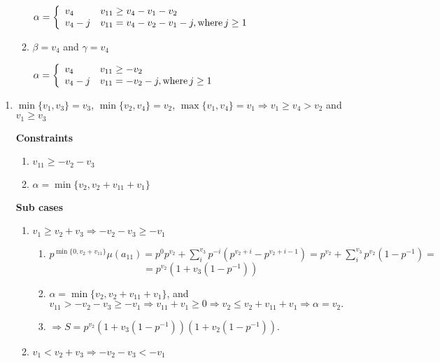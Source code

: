 \documentclass{article}
\begin{document}
\begin{enumerate}
\begin{enumerate}
$\alpha=\left\{
	\begin{array}{ll}
            v_4  & v_{11}\geq{v_4-v_1-v_2} \\
		  v_4-j & v_{11}=v_4-v_2-v_1-j, \text{where\,}j\geq{1}
	\end{array}
\right.$    
\item $\beta=v_4$ and $\gamma=v_4$

$\alpha=\left\{
	\begin{array}{ll}
            v_4  & v_{11}\geq{-v_2} \\
		  v_4-j & v_{11}=-v_2-j, \text{where\,}j\geq{1}
	\end{array}
\right.$
\end{enumerate}
\end{enumerate}
\begin{enumerate}
    \item $\min\{v_1,v_3\}=v_3$, $\min\{v_2,v_4\}=v_2$, $\max\{v_1,v_4\}=v_1\Rightarrow{v_1}\geq{v_4}>v_2$ and $v_1\geq{v_3}$
    
    \textbf{Constraints}
    \begin{enumerate}
        \item $v_{11}\geq{-v_2-v_3}$
        \item $\alpha=\min\{v_2,v_2+v_{11}+v_1\}$
    \end{enumerate}
    
    \textbf{Sub cases}
    \begin{enumerate}
        \item $v_1\geq{v_2+v_3}\Rightarrow{-v_2-v_3\geq{-v_1}}$

        \begin{enumerate}
            \item $p^{\min\{0,v_2+v_{11}\}}\mu(a_{11})=p^{0}p^{v_2}+\sum_i^{v_3}p^{-i}(p^{v_2+i}-p^{v_2+i-1})=p^{v_2}+\sum_i^{v_3}p^{v_2}(1-p^{-1})=$\[=p^{v_2}(1+v_3(1-p^{-1}))\]
            \item $\alpha=\min\{v_2,v_2+v_{11}+v_1\}$, and $v_{11}>-v_2-v_3\geq{-v_1}\Rightarrow{v_{11}+v_1\geq{0}}\Rightarrow{v_2\leq{v_2+v_{11}+v_1}}\Rightarrow{\alpha=v_2}.$
            \item $\Rightarrow{S=p^{v_2}(1+v_3(1-p^{-1}))(1+v_2(1-p^{-1}))}.$
        \end{enumerate}

        \item $v_1<{v_2+v_3}\Rightarrow{-v_2-v_3<-v_1}$


\end{enumerate}
\end{enumerate}
\end{document}
